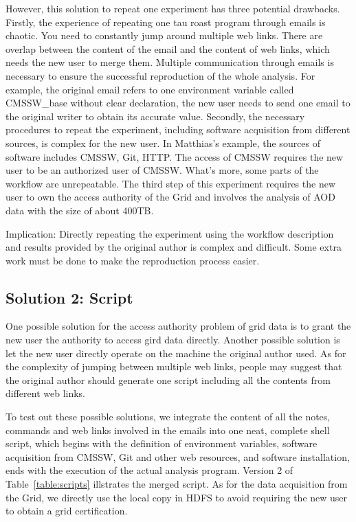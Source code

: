 \documentclass{acm_proc_article-sp}
\begin{document}
However, this solution to repeat one experiment has three potential drawbacks.
Firstly, the experience of repeating one tau roast program through emails is
chaotic. You need to constantly jump around multiple web links. There are overlap
between the content of the email and the content of web links, which needs the
new user to merge them. Multiple communication through emails is necessary to
ensure the successful reproduction of the whole analysis. For example, the original
email refers to one environment variable called CMSSW\_base without clear
declaration, the new user needs to send one email to the original writer to
obtain its accurate value. Secondly, the necessary procedures to repeat the
experiment, including software acquisition from different sources, is complex
for the new user. In Matthias's example, the sources of software includes
CMSSW, Git, HTTP. The access of CMSSW requires the new user to be an authorized
user of CMSSW. What's more, some parts of the workflow are unrepeatable. The
third step of this experiment requires the new user to own the access authority
of the Grid and involves the analysis of AOD data with the size of about 400TB.

Implication: Directly repeating the experiment using the workflow description and results provided by the original author is complex and difficult. Some extra work must be done to make the reproduction process easier.

\subsection{Solution 2: Script} One possible solution for the access authority
problem of grid data is to grant the new user the authority to access gird data
directly. Another possible solution is let the new user directly operate on the
machine the original author used. As for the complexity of jumping between
multiple web links, people may suggest that the original author
should generate one script including all the contents from different web links.

To test out these possible solutions, we integrate the content of all the notes, commands and web links involved in the emails into one neat, complete shell script, which begins with the definition of environment variables, software acquisition from CMSSW, Git and other web resources, and software installation, ends with the execution of the actual analysis program. Version 2 of Table~\ref{table:scripts} illstrates the merged script. As for the data acquisition from the Grid, we directly use the local copy in HDFS to avoid requiring the new user to obtain a grid certification.
\end{document}

